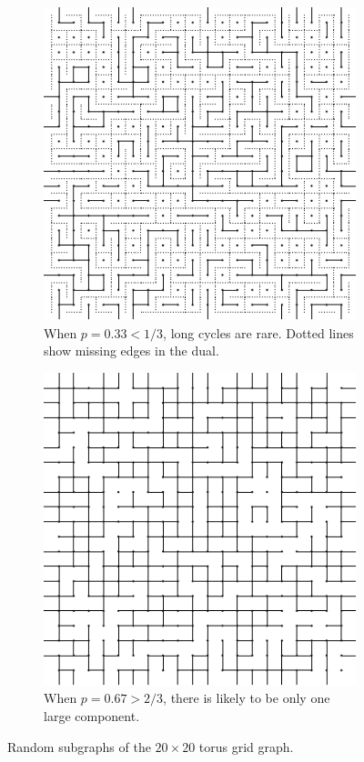 \documentclass[format=acmsmall, review=false, screen=true]{acmart}
\begin{document}
\begin{figure}
  \centering
  \begin{subfigure}[t]{0.45\textwidth}
    \includegraphics{torusrare}
    \caption{When $p = 0.33 < 1/3$, long cycles are rare. Dotted lines show
      missing edges in the dual.}
  \end{subfigure}
  \quad\quad
  \begin{subfigure}[t]{0.45\textwidth}
    \includegraphics{torusdense}
    \caption{When $p = 0.67 > 2/3$, there is likely to be only one large
      component.}
  \end{subfigure}
  \caption{Random subgraphs of the $20 \times 20$ torus grid graph.}
\end{figure}
\end{document}

